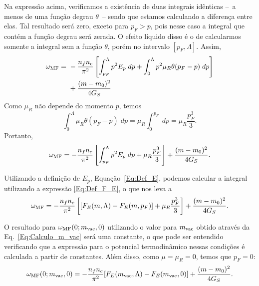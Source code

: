Na expressão acima, verificamos a existência de duas integrais idênticas --~a menos de uma função degrau $\theta$~-- sendo que estamos calculando a diferença entre elas. Tal resultado será zero, exceto para $p_F > p$, pois nesse caso a integral que contém a função degrau será zerada. O efeito líquido disso é o de calcularmos somente a integral sem a função $\theta$, porém no intervalo $[p_F, \Lambda]$. Assim,
\begin{equation}
\begin{split}
\omega_{\rm{MF}} =&~ - \frac{n_f n_c}{\pi^2} \left[\int_{p_F}^\Lambda p^2E_p \; dp + \int_0^\Lambda p^2 \mu_R \theta(p_F - p)\;dp \right] \\
&~ + \frac{(m-m_0)^2}{4G_S} \\
\end{split}
\end{equation}
%
Como $\mu_R$ não depende do momento $p$, temos
\begin{equation}
	\int_0^\Lambda \mu_R \theta(p_F - p) \; dp = \mu_R \int_{0}^{p_F} \; dp = \mu_R\frac{p_F^3}{3}.
\end{equation}
%
Portanto,
\begin{equation}
\omega_{\rm{MF}} = - \frac{n_f n_c}{\pi^2} \left[\int_{p_F}^\Lambda p^2E_p \; dp + \mu_R \frac{p_F^3}{3} \right] + \frac{(m-m_0)^2}{4G_S}.
\end{equation}

Utilizando a definição de $E_p$, Equação~\eqref{Eq:Def_E}, podemos calcular a integral utilizando a expressão \eqref{Eq:Def_F_E}, o que nos leva a
\begin{equation}\label{Eq:Pot_termodinamico_1}
\omega_{\rm{MF}} = - \frac{n_f n_c}{\pi^2} \left[[F_E(m,\Lambda) - F_E(m, p_F)] + \mu_R \frac{p_F^3}{3} \right] + \frac{(m-m_0)^2}{4G_S}.
\end{equation}

O resultado  para $\omega_{\rm{MF}}(0;m_{\rm{vac}},0)$ utilizando o valor para $m_{\rm{vac}}$ obtido através da Eq.~\eqref{Eq:Calculo_m_vac} será uma constante, o que pode ser entendido verificando que a expressão para o potencial termodinâmico nessas condições é calculada a partir de constantes. Além disso, como $\mu = \mu_R = 0$, temos que $p_F = 0$:
\begin{equation}\label{Eq:Pot_termodinamico_1_vacuo}
\omega_{\rm{MF}}(0;m_{\rm{vac}},0) = - \frac{n_f n_c}{\pi^2}[F_E(m_{\rm{vac}},\Lambda) - F_E(m_{\rm{vac}}, 0)] + \frac{(m-m_0)^2}{4G_S}.
\end{equation}

